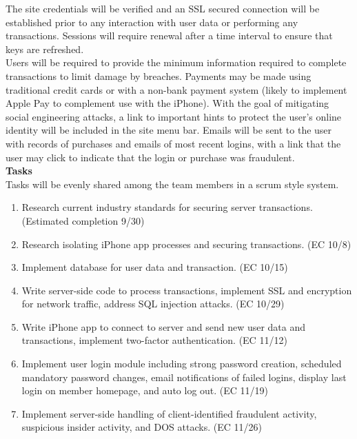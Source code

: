 \documentclass[12pt]{article}
\begin{document}
The site credentials will be verified and an SSL secured connection will be established prior to any interaction with user data or performing any transactions.  Sessions will require renewal after a time interval to ensure that keys are refreshed. \\

Users will be required to provide the minimum information required to complete transactions to limit damage by breaches. Payments may be made using traditional credit cards or with a non-bank payment system (likely to implement Apple Pay to complement use with the iPhone).  With the goal of mitigating social engineering attacks, a link to important hints to protect the user's online identity will be included in the site menu bar.  Emails will be sent to the user with records of purchases and emails of most recent logins, with a link that the user may click to indicate that the login or purchase was fraudulent. \\

\textbf{Tasks} \\
Tasks will be evenly shared among the team members in a scrum style system. 
\begin{enumerate}
\item Research current industry standards for securing server transactions. (Estimated completion 9/30)
\item Research isolating iPhone app processes and securing transactions. (EC 10/8)
\item Implement database for user data and transaction. (EC 10/15)
\item Write server-side code to process transactions, implement SSL and encryption for network traffic, address SQL injection attacks. (EC 10/29)
\item Write iPhone app to connect to server and send new user data and transactions, implement two-factor authentication. (EC 11/12)
\item Implement user login module including strong password creation, scheduled mandatory password changes, email notifications of failed logins, display last login on member homepage, and auto log out. (EC 11/19)
\item Implement server-side handling of client-identified fraudulent activity, suspicious insider activity, and DOS attacks. (EC 11/26)
\end{enumerate}
\end{document}
